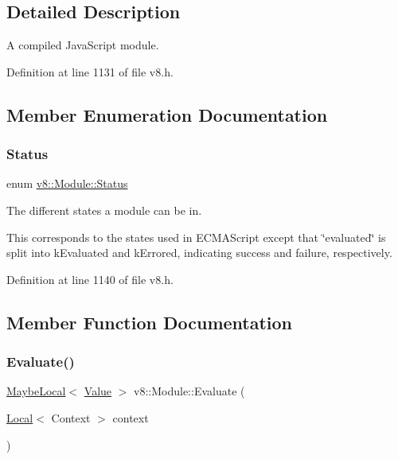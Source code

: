 \subsection{Detailed Description}
A compiled Java\+Script module. 

Definition at line 1131 of file v8.\+h.



\subsection{Member Enumeration Documentation}
\mbox{\label{classv8_1_1Module_a9c2a22c9cb8e928d570c38648c648b7e}} 
\subsubsection{\texorpdfstring{Status}{Status}}
{\footnotesize\ttfamily enum \mbox{\hyperlink{classv8_1_1Module_a9c2a22c9cb8e928d570c38648c648b7e}{v8\+::\+Module\+::\+Status}}}

The different states a module can be in.

This corresponds to the states used in E\+C\+M\+A\+Script except that \char`\"{}evaluated\char`\"{} is split into k\+Evaluated and k\+Errored, indicating success and failure, respectively. 

Definition at line 1140 of file v8.\+h.



\subsection{Member Function Documentation}
\mbox{\label{classv8_1_1Module_a1f1758265a4082595757c3251bb40e0f}} 
\subsubsection{\texorpdfstring{Evaluate()}{Evaluate()}}
{\footnotesize\ttfamily \mbox{\hyperlink{classv8_1_1MaybeLocal}{Maybe\+Local}}$<$ \mbox{\hyperlink{classv8_1_1Value}{Value}} $>$ v8\+::\+Module\+::\+Evaluate (\begin{DoxyParamCaption}\item[{\mbox{\hyperlink{classv8_1_1Local}{Local}}$<$ Context $>$}]{context }\end{DoxyParamCaption})}


